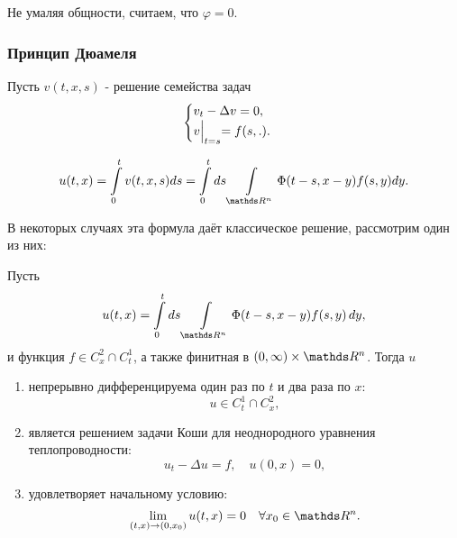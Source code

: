 Не умаляя общности, считаем, что $\varphi = 0$.

\subsubsection*{Принцип Дюамеля}

Пусть $v(t,x,s)$ - решение семейства задач
\begin{equation*}
    \begin{cases} 
        v_t - \Delta v = 0, \\
        v\Bigl|_{t=s} = f(s, .).
    \end{cases}
\end{equation*}

$$u(t,x) = \int\limits_0^tv(t,x,s)ds = \int\limits_0^t ds \int\limits_{\real^n}\Phi(t-s, x-y)f(s,y)dy.$$

В некоторых случаях эта формула даёт классическое решение, рассмотрим один из них:

\begin{theorem}
Пусть $$u(t,x) = \int\limits_0^t ds \int \limits_{\real^n} \Phi (t-s, x-y) f(s,y) \, dy ,$$ и функция $f\in C_x^2 \cap C_t^1$, а также финитная в $(0, \infty) \times \real^n$. Тогда $u$
\begin{enumerate}
\item непрерывно дифференцируема один раз по $t$ и два раза по $x$: $$u \in C_t^1 \cap C_x^2,$$
\item является решением задачи Коши для неоднородного уравнения теплопроводности: $$u_t - \Delta u = f, \quad u(0,x) = 0,$$
\item удовлетворяет начальному условию: $$\lim_{(t,x) \to (0,x_0)} u(t,x) = 0 \quad  \forall x_0 \in \real^n.$$
\end{enumerate}
\end{theorem}

